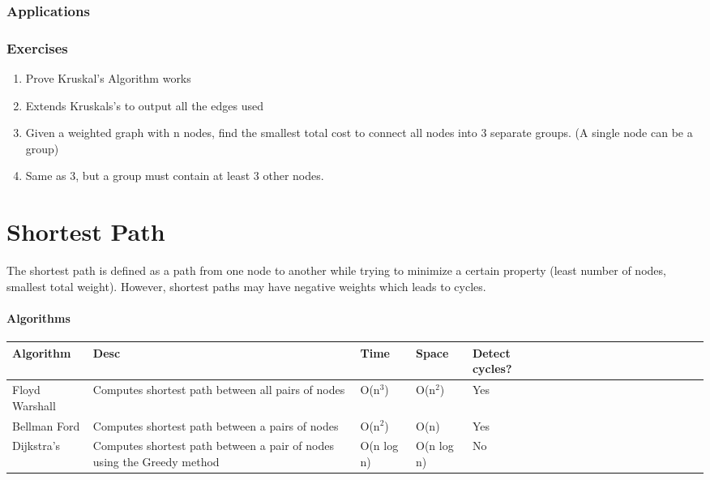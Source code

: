 \documentclass[11pt,oneside]{book}
\begin{document}
\subsection{Applications}

\subsection{Exercises}

\begin{enumerate}
\item Prove Kruskal's Algorithm works
\item Extends Kruskals's to output all the edges used
\item Given a weighted graph with n nodes, find the smallest total cost to connect all nodes into 3 separate groups. (A single node can be a group)
\item Same as 3, but a group must contain at least 3 other nodes.
\end{enumerate}

    \chapter{ Shortest Path }
        

The shortest path is defined as a path from one node to another while trying to minimize a certain property (least number of nodes, smallest total weight). However, shortest paths may have negative weights which leads to cycles.

\subsubsection{Algorithms}

\vspace{10px}\begin{tabulary}{0.4\linewidth}{|l|l|l|l|l|l|l|l|l|l|l|l|l|l|l|l|l|l|l}\hline


  Algorithm &
  Desc &
  Time &
  Space &
  Detect cycles?\\
\hline


  Floyd Warshall &
  Computes shortest path between all pairs of nodes &
  O(n$^{3}$) &
  O(n$^{2}$) &
  Yes\\

  Bellman Ford &
  Computes shortest path between a pairs of nodes &
  O(n$^{2}$) &
  O(n) &
  Yes\\

  Dijkstra's &
  Computes shortest path between a pair of nodes using the Greedy method &
  O(n log n) &
  O(n log n) &
  No\\

\hline\end{tabulary}
\end{document}
